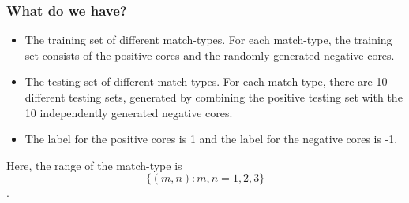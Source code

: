 \documentclass[hyperref={pdfpagelabels=false}]{beamer}
\begin{document}
\begin{frame}
\frametitle{What do we have?}
\begin{itemize}
		\item The training set of different match-types. For each match-type, the training set consists of the positive cores and the randomly generated negative cores. 
		\item The testing set of different match-types. For each match-type, there are 10 different testing sets, generated by combining the positive testing set with the 10 independently generated negative cores.
		\item The label for the positive cores is 1 and the label for the negative cores is -1.
	\end{itemize}
Here, the range of the match-type is $$\{(m,n): m,n = 1, 2, 3\}$$. 
\end{frame}
%
%
\end{document}

